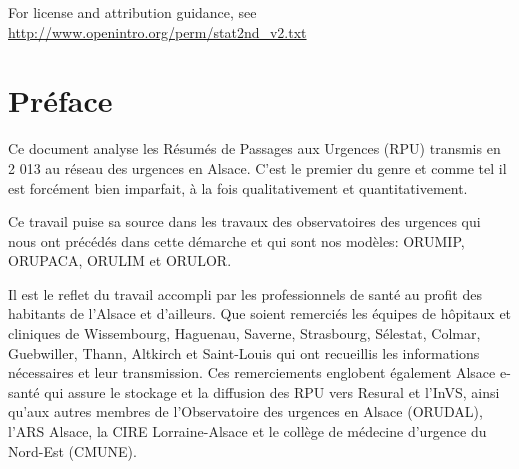 \documentclass[12pt,english,french,twoside]{book}\usepackage[]{graphicx}\usepackage[]{color}
\makeatletter
\newenvironment{kframe}{%
 \def\at@end@of@kframe{}%
 \ifinner\ifhmode%
  \def\at@end@of@kframe{\end{minipage}}%
  \begin{minipage}{\columnwidth}%
 \fi\fi%
 \def\FrameCommand##1{\hskip\@totalleftmargin \hskip-\fboxsep
 \colorbox{shadecolor}{##1}\hskip-\fboxsep
     \hskip-\linewidth \hskip-\@totalleftmargin \hskip\columnwidth}%
 \MakeFramed {\advance\hsize-\width
   \@totalleftmargin\z@ \linewidth\hsize
   \@setminipage}}%
 {\par\unskip\endMakeFramed%
 \at@end@of@kframe}
\newenvironment{knitrout}{}{} %
\makeatother
\begin{document}
\noindent For license and attribution guidance, see \url{http://www.openintro.org/perm/stat2nd_v2.txt}

\mainmatter

\tableofcontents
\listoftables
\listoffigures

\begin{knitrout}
\color{fgcolor}\begin{kframe}


{\ttfamily\noindent\bfseries\color{errorcolor}{\#\# Error: there is no package called 'gdata'}}

{\ttfamily\noindent\bfseries\color{errorcolor}{\#\# Error: there is no package called 'rattle'}}\end{kframe}
\end{knitrout}



\chapter*{Préface}


Ce document analyse les Résumés de Passages aux Urgences (RPU) transmis en 2 013 au réseau des urgences en Alsace. C'est le premier du genre et comme tel il est forcément bien imparfait, à la fois qualitativement et quantitativement.

Ce travail puise sa source dans les travaux des observatoires des urgences qui nous ont précédés dans cette démarche et qui sont nos modèles: ORUMIP, ORUPACA, ORULIM et ORULOR.

Il est le reflet du travail accompli par les professionnels de santé au profit des habitants de l'Alsace et d'ailleurs. Que soient remerciés les équipes de hôpitaux et cliniques de Wissembourg, Haguenau, Saverne, Strasbourg, Sélestat, Colmar, Guebwiller, Thann, Altkirch et Saint-Louis qui ont recueillis les informations nécessaires et leur transmission. Ces remerciements englobent également Alsace e-santé qui assure le stockage et la diffusion des RPU vers Resural et l'InVS, ainsi qu'aux autres membres de l'Observatoire des urgences en Alsace (ORUDAL), l'ARS Alsace, la CIRE Lorraine-Alsace et le collège de médecine d'urgence du Nord-Est (CMUNE).
\end{document}
